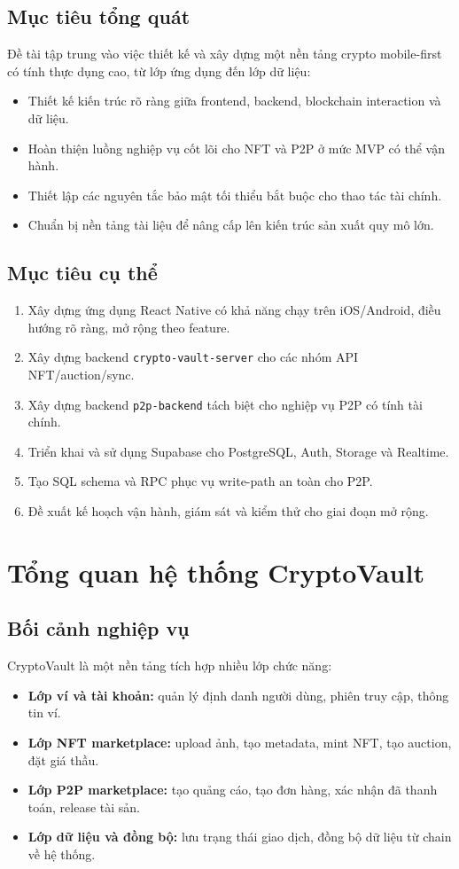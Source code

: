 \documentclass[a4paper,12pt]{report}
\begin{document}
\section{Mục tiêu tổng quát}
Đề tài tập trung vào việc thiết kế và xây dựng một nền tảng crypto mobile-first có tính thực dụng cao, từ lớp ứng dụng đến lớp dữ liệu:
\begin{itemize}
    \item Thiết kế kiến trúc rõ ràng giữa frontend, backend, blockchain interaction và dữ liệu.
    \item Hoàn thiện luồng nghiệp vụ cốt lõi cho NFT và P2P ở mức MVP có thể vận hành.
    \item Thiết lập các nguyên tắc bảo mật tối thiểu bắt buộc cho thao tác tài chính.
    \item Chuẩn bị nền tảng tài liệu để nâng cấp lên kiến trúc sản xuất quy mô lớn.
\end{itemize}

\section{Mục tiêu cụ thể}
\begin{enumerate}
    \item Xây dựng ứng dụng React Native có khả năng chạy trên iOS/Android, điều hướng rõ ràng, mở rộng theo feature.
    \item Xây dựng backend \texttt{crypto-vault-server} cho các nhóm API NFT/auction/sync.
    \item Xây dựng backend \texttt{p2p-backend} tách biệt cho nghiệp vụ P2P có tính tài chính.
    \item Triển khai và sử dụng Supabase cho PostgreSQL, Auth, Storage và Realtime.
    \item Tạo SQL schema và RPC phục vụ write-path an toàn cho P2P.
    \item Đề xuất kế hoạch vận hành, giám sát và kiểm thử cho giai đoạn mở rộng.
\end{enumerate}

\chapter{Tổng quan hệ thống CryptoVault}

\section{Bối cảnh nghiệp vụ}
CryptoVault là một nền tảng tích hợp nhiều lớp chức năng:
\begin{itemize}
    \item \textbf{Lớp ví và tài khoản:} quản lý định danh người dùng, phiên truy cập, thông tin ví.
    \item \textbf{Lớp NFT marketplace:} upload ảnh, tạo metadata, mint NFT, tạo auction, đặt giá thầu.
    \item \textbf{Lớp P2P marketplace:} tạo quảng cáo, tạo đơn hàng, xác nhận đã thanh toán, release tài sản.
    \item \textbf{Lớp dữ liệu và đồng bộ:} lưu trạng thái giao dịch, đồng bộ dữ liệu từ chain về hệ thống.
\end{itemize}
\end{document}
